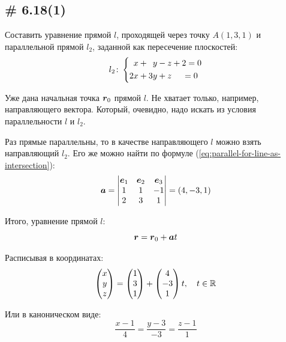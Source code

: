 \documentclass[a4paper,12pt]{article}
\begin{document}
  
  
  \subsection{\# 6.18(1)}
  
  \begin{problem}
    Составить уравнение прямой $l$, проходящей через точку $A(1, 3, 1)$ и параллельной прямой $l_2$, заданной как пересечение плоскостей:
    \[
      l_2\colon \left\{
        \begin{aligned}
          &\hphantom{2}x + \hphantom{3}y - z + 2 = 0\\
          &2x            + 3y            + z \hphantom{+ 2} = 0
        \end{aligned}
      \right.
    \]
  \end{problem}
  
  \begin{solution}
    Уже дана начальная точка $\boldsymbol r_0$ прямой $l$.
    Не хватает только, например, направляющего вектора.
    Который, очевидно, надо искать из условия параллельности $l$ и $l_2$.
    
    Раз прямые параллельны, то в качестве направляющего $l$ можно взять направляющий $l_2$.
    Его же можно найти по формуле (\ref{eq:parallel-for-line-as-intersection}):
    \[
      \boldsymbol a = \begin{vmatrix}
        \boldsymbol e_1 & \boldsymbol e_2 & \boldsymbol e_3\\
        1        & 1        & -1\\
        2        & 3        & 1
      \end{vmatrix}
      = (4, -3, 1)
    \]
    
    Итого, уравнение прямой $l$:
    \[
      \boldsymbol r = \boldsymbol r_0 + \boldsymbol a t
    \]
    
    Расписывая в координатах:
    \[
      \begin{pmatrix}
        x \\ y \\ z
      \end{pmatrix}
      = \begin{pmatrix}
        1 \\ 3 \\ 1
      \end{pmatrix}
      + \begin{pmatrix}
        4 \\ -3 \\ 1
      \end{pmatrix} t,\quad t \in \operatorname{\mathbb R}
    \]
    
    Или в каноническом виде:
    \[
      \frac{x - 1}{4} = \frac{y - 3}{-3} = \frac{z - 1}{1}
    \]
  \end{solution}
  
\end{document}
